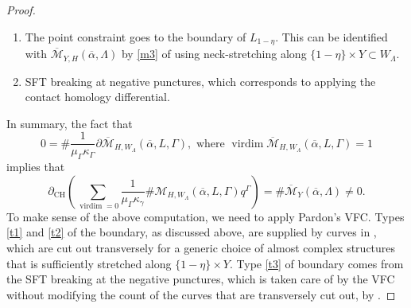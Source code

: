 \documentclass[reqno,11pt]{amsart}
\numberwithin{equation}{section}
\def\cM{{\mathcal M}}
\DeclareMathOperator{\virdim}{virdim}
\DeclareMathOperator{\CH}{CH}
\begin{document}
\begin{proof}
\begin{enumerate}
\begin{figure}[H]
\begin{tikzpicture}
    \end{tikzpicture}
    \caption{The Floer breaking, boundary constraint, and SFT breaking respectively. The first and second curves (with the marked asymptotics) do not appear by  and neck-stretching}
    \end{figure}
        \item\label{t2} The point constraint goes to the boundary of $L_{1-\eta}$. This can be identified with $\overline{\cM}_{Y,H}(\overline{\alpha},\Lambda)$ by \eqref{m3} of  using neck-stretching along $\{1-\eta\}\times Y \subset W_{\Lambda}$.
        \item\label{t3} SFT breaking at negative punctures, which corresponds to applying the contact homology differential. 
    \end{enumerate}
    In summary, the fact that 
    $$0=\#\frac{1}{\mu_{\Gamma}\kappa_{\Gamma}}\partial \overline{\cM}_{H,W_{\Lambda}}(\overline{\alpha},L,\Gamma), \text{ where }\virdim \overline{\cM}_{H,W_{\Lambda}}(\overline{\alpha},L,\Gamma)=1$$
    implies that
    $$\partial_{\CH}(\sum_{\virdim = 0}\frac{1}{\mu_{\Gamma}\kappa_{\gamma}}\#\cM_{H,W_{\Lambda}}(\overline{\alpha},L,\Gamma)q^{\Gamma})=\#\overline{\cM}_Y(\overline{\alpha},\Lambda) \ne 0.$$
    To make sense of the above computation, we need to apply Pardon's VFC. Types \eqref{t1} and \eqref{t2} of the boundary, as discussed above, are supplied by curves in , which are cut out transversely for a generic choice of almost complex structures that is sufficiently stretched along $\{1-\eta\}\times Y$. Type \eqref{t3} of boundary comes from the SFT breaking at the negative punctures, which is taken care of by the VFC without modifying the count of the curves that are transversely cut out, by \cite[Proposition 4.33]{zbMATH07085531}.
\end{proof}
\end{document}
